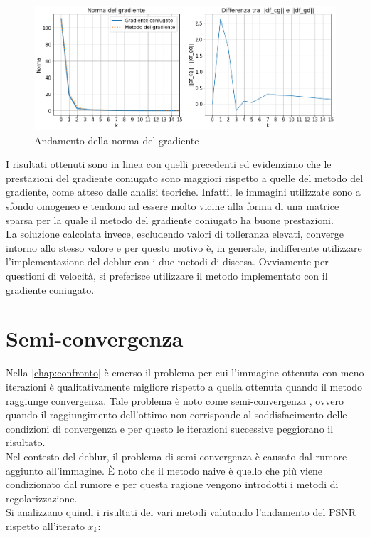 \documentclass[11pt]{article}
\begin{document}
\begin{figure}[H]
    \centering
    \includegraphics[width=14cm]{iterazioni_cg_gd/2/norma_gradiente.png}
    \caption{Andamento della norma del gradiente}
    \label{fig:gradiente2}
\end{figure}

I risultati ottenuti sono in linea con quelli precedenti ed evidenziano che le prestazioni del gradiente coniugato sono maggiori rispetto a quelle del metodo del gradiente, 
come atteso dalle analisi teoriche. Infatti, le immagini utilizzate sono a sfondo omogeneo e tendono ad essere molto vicine alla forma di una matrice sparsa per la quale il metodo del gradiente coniugato ha buone prestazioni.\\
La soluzione calcolata invece, escludendo valori di tolleranza elevati, converge intorno allo stesso valore e per questo motivo è, in generale, indifferente utilizzare l'implementazione del deblur con i due metodi di discesa. Ovviamente per questioni di velocità, si preferisce utilizzare il metodo implementato con il gradiente coniugato.




\newpage
\section{Semi-convergenza}
\label{chap:semiconv}
Nella \autoref{chap:confronto} è emerso il problema per cui l'immagine ottenuta con meno iterazioni è qualitativamente migliore rispetto a quella ottenuta quando il metodo raggiunge convergenza. 
Tale problema è noto come semi-convergenza \cite{1}\cite{2}\cite{3}, ovvero quando il raggiungimento dell'ottimo non corrisponde al soddisfacimento delle condizioni di convergenza e per questo le iterazioni successive peggiorano il risultato.\\
Nel contesto del deblur, il problema di semi-convergenza è causato dal rumore aggiunto all'immagine. È noto che il metodo naive è quello che più viene condizionato dal rumore e per questa ragione vengono introdotti i metodi di regolarizzazione.\\
Si analizzano quindi i risultati dei vari metodi valutando l'andamento del PSNR rispetto all'iterato $x_{k}$:
\end{document}
